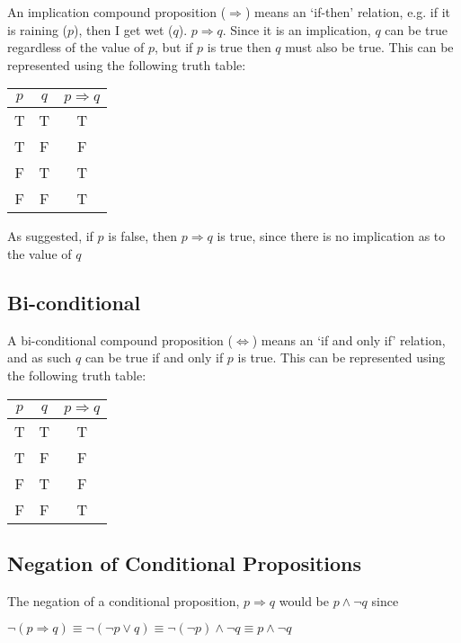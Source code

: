 An implication compound proposition ($\Rightarrow$) means an `if-then' relation, e.g. if it is raining ($p$), then I get
 wet ($q$). $p \Rightarrow q$. Since it is an implication, $q$ can be true regardless of the value of $p$, but if $p$ is
 true then $q$ must also be true. This can be represented using the following truth table:
\begin{table}[h]
  \centering
  \begin{tabular}{ c c c }
    $p$ & $q$ & $p \Rightarrow q$ \\
    \hline
    T & T & T \\
    T & F & F \\
    F & T & T \\
    F & F & T
  \end{tabular}
\end{table}

As suggested, if $p$ is false, then $p \Rightarrow q$ is true, since there is no implication as to the value of $q$

\subsection*{Bi-conditional}

A bi-conditional compound proposition ($\Leftrightarrow$) means an `if and only if' relation, and as such $q$ can be
 true if and only if $p$ is true. This can be represented using the following truth table:
\begin{table}[h]
  \centering
  \begin{tabular}{ c c c }
    $p$ & $q$ & $p \Rightarrow q$ \\
    \hline
    T & T & T \\
    T & F & F \\
    F & T & F \\
    F & F & T
  \end{tabular}
\end{table}

\subsection*{Negation of Conditional Propositions}

The negation of a conditional proposition, $p \Rightarrow q$ would be $p \wedge \neg q$ since
\begin{center}
  $\neg (p \Rightarrow q) \equiv \neg (\neg p \vee q) \equiv \neg (\neg p) \wedge \neg q \equiv p \wedge \neg q$
\end{center}

